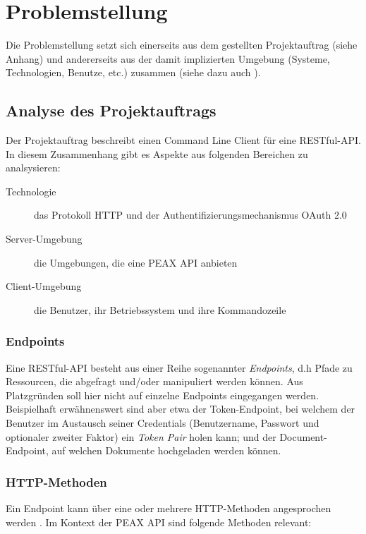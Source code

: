 \section{Problemstellung}

Die Problemstellung setzt sich einerseits aus dem gestellten Projektauftrag (siehe Anhang) und andererseits aus der damit implizierten Umgebung (Systeme, Technologien, Benutze, etc.) zusammen (siehe dazu auch ).

\subsection{Analyse des Projektauftrags}

Der Projektauftrag beschreibt einen Command Line Client für eine RESTful-API. In diesem Zusammenhang gibt es Aspekte aus folgenden Bereichen zu analsysieren:

\begin{description}
    \item[Technologie] das Protokoll HTTP und der Authentifizierungsmechanismus OAuth 2.0
    \item[Server-Umgebung] die Umgebungen, die eine PEAX API anbieten
    \item[Client-Umgebung] die Benutzer, ihr Betriebssystem und ihre Kommandozeile
\end{description}

\subsubsection{Endpoints}

Eine RESTful-API besteht aus einer Reihe sogenannter \textit{Endpoints}, d.h Pfade zu Ressourcen, die abgefragt und/oder manipuliert werden können. Aus Platzgründen soll hier nicht auf einzelne Endpoints eingegangen werden. Beispielhaft erwähnenswert sind aber etwa der Token-Endpoint, bei welchem der Benutzer im Austausch seiner Credentials (Benutzername, Passwort und optionaler zweiter Faktor) ein \textit{Token Pair} holen kann; und der Document-Endpoint, auf welchen Dokumente hochgeladen werden können.

\subsubsection{HTTP-Methoden}

Ein Endpoint kann über eine oder mehrere HTTP-Methoden angesprochen werden \cite[Abschnitt 4.3]{RFC7231}. Im Kontext der PEAX API sind folgende Methoden relevant:

